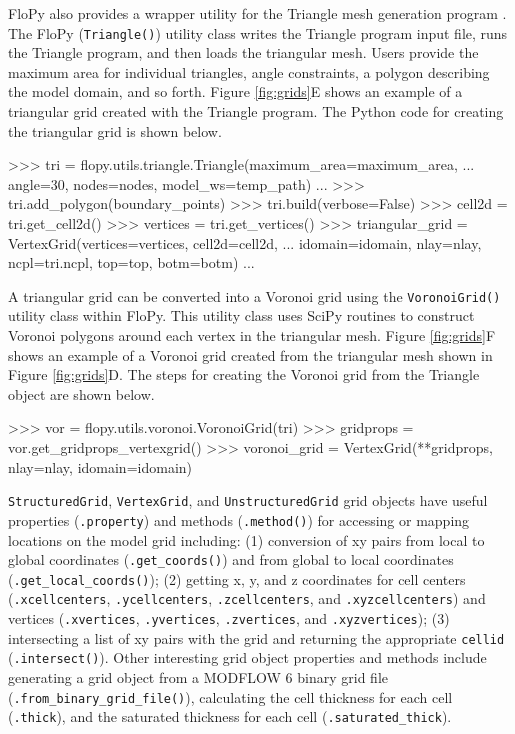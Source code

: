 \documentclass[11pt, oneside]{article}  	%
\begin{document}
FloPy also provides a wrapper utility for the Triangle mesh generation program \citep{trianglemesh}. The FloPy (\texttt{Triangle()}) utility class writes the Triangle program input file, runs the Triangle program, and then loads the triangular mesh. Users provide the maximum area for individual triangles, angle constraints, a polygon describing the model domain, and so forth. Figure \ref{fig:grids}E shows an example of a triangular grid created with the Triangle program. The Python code for creating the triangular grid is shown below.

\begin{python}
>>> tri = flopy.utils.triangle.Triangle(maximum_area=maximum_area, 
... angle=30, nodes=nodes, model_ws=temp_path)
...
>>> tri.add_polygon(boundary_points)
>>> tri.build(verbose=False)
>>> cell2d = tri.get_cell2d()
>>> vertices = tri.get_vertices()
>>> triangular_grid = VertexGrid(vertices=vertices, cell2d=cell2d, 
... idomain=idomain, nlay=nlay, ncpl=tri.ncpl, top=top, botm=botm)
...
\end{python}

A triangular grid can be converted into a Voronoi grid using the \texttt{VoronoiGrid()} utility class within FloPy. This utility class uses SciPy routines \citep{2020SciPy-NMeth} to construct Voronoi polygons around each vertex in the triangular mesh. Figure \ref{fig:grids}F shows an example of a Voronoi grid created from the triangular mesh shown in Figure \ref{fig:grids}D. The steps for creating the Voronoi grid from the Triangle object are shown below.

\begin{python}
>>> vor = flopy.utils.voronoi.VoronoiGrid(tri)
>>> gridprops = vor.get_gridprops_vertexgrid()
>>> voronoi_grid = VertexGrid(**gridprops, nlay=nlay, idomain=idomain)
\end{python}

\texttt{StructuredGrid}, \texttt{VertexGrid}, and \texttt{UnstructuredGrid} grid objects have useful properties (\texttt{.property}) and methods (\texttt{.method()}) for accessing or mapping locations on the model grid including: (1) conversion of xy pairs from local to global coordinates (\texttt{.get\_coords()}) and from global to local coordinates (\texttt{.get\_local\_coords()}); (2) getting x, y, and z coordinates for cell centers (\texttt{.xcellcenters}, \texttt{.ycellcenters}, \texttt{.zcellcenters}, and \texttt{.xyzcellcenters}) and vertices (\texttt{.xvertices}, \texttt{.yvertices}, \texttt{.zvertices}, and \texttt{.xyzvertices}); (3) intersecting a list of xy pairs with the grid and returning the appropriate \texttt{cellid} (\texttt{.intersect()}). Other interesting grid object properties and methods include generating a grid object from a MODFLOW 6 binary grid file (\texttt{.from\_binary\_grid\_file()}), calculating the cell thickness for each cell (\texttt{.thick}), and the saturated thickness for each cell (\texttt{.saturated\_thick}).
\end{document}
